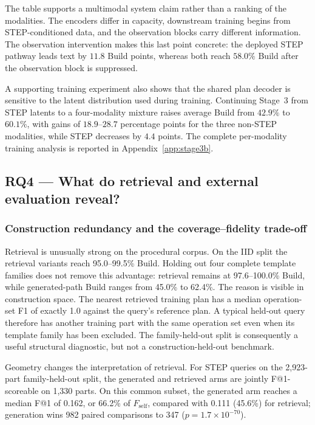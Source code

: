 \documentclass[preprint,12pt]{elsarticle}
\begin{document}
The table supports a multimodal system claim rather than a ranking of the
modalities. The encoders differ in capacity, downstream training begins from
STEP-conditioned data, and the observation blocks carry different information.
The observation intervention makes this last point concrete: the deployed STEP
pathway leads text by $11.8$ Build points, whereas both reach $58.0\%$ Build
after the observation block is suppressed.

A supporting training experiment also shows that the shared plan decoder is
sensitive to the latent distribution used during training. Continuing Stage~3
from STEP latents to a four-modality mixture raises average Build from
$42.9\%$ to $60.1\%$, with gains of $18.9$--$28.7$ percentage points for the
three non-STEP modalities, while STEP decreases by $4.4$ points. The complete
per-modality training analysis is reported in Appendix~\ref{app:stage3b}.


\subsection{RQ4 --- What do retrieval and external evaluation reveal?}
\label{sec:rq4}

\subsubsection{Construction redundancy and the coverage--fidelity trade-off}
\label{sec:redundancy}

Retrieval is unusually strong on the procedural corpus. On the IID split the
retrieval variants reach 95.0--99.5\% Build. Holding out four complete
template families does not remove this advantage: retrieval remains at
97.6--100.0\% Build, while generated-path Build ranges from 45.0\% to 62.4\%.
The reason is visible in construction space. The nearest retrieved training
plan has a median operation-set F1 of exactly 1.0 against the query's reference
plan. A typical held-out query therefore has another training part with the
same operation set even when its template family has been excluded. The
family-held-out split is consequently a useful structural diagnostic, but not
a construction-held-out benchmark.

Geometry changes the interpretation of retrieval. For STEP queries on the
2,923-part family-held-out split, the generated and retrieved arms are jointly
F@1-scoreable on 1,330 parts. On this common subset, the generated arm reaches
a median F@1 of 0.162, or 66.2\% of $F_{\mathrm{self}}$, compared with 0.111
(45.6\%) for retrieval; generation wins 982 paired comparisons to 347
($p=1.7\times10^{-70}$).
\end{document}
